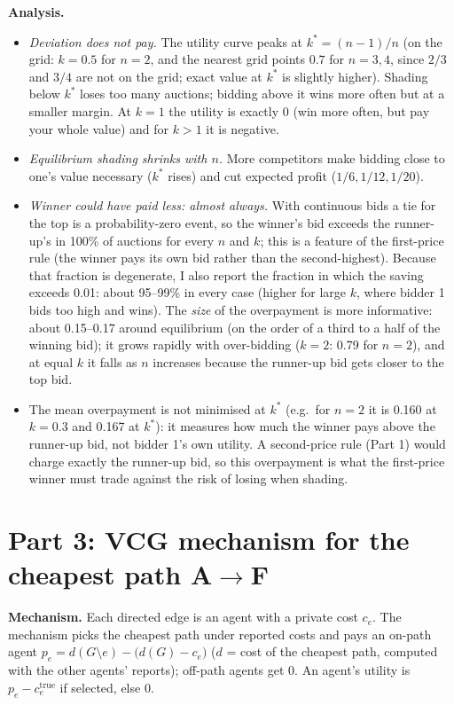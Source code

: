 \documentclass[11pt,a4paper]{article}
\begin{document}
\textbf{Analysis.}
\begin{itemize}
\item \emph{Deviation does not pay.} The utility curve peaks at $k^*=(n-1)/n$ (on the grid: $k=0.5$ for $n=2$, and the nearest grid points $0.7$ for $n=3,4$, since $2/3$
and $3/4$ are not on the grid; exact value at $k^*$ is slightly higher). Shading below $k^*$ loses too many auctions; bidding above
it wins more often but at a smaller margin. At $k=1$ the utility is exactly 0 (win more often, but pay your whole value) and for $k>1$ it is negative.
\item \emph{Equilibrium shading shrinks with $n$.} More competitors make bidding close to one's value necessary ($k^*$ rises)
and cut expected profit ($1/6,1/12,1/20$).
\item \emph{Winner could have paid less: almost always.} With continuous bids a tie for the top is a
probability-zero event, so the winner's bid exceeds the runner-up's in 100\% of auctions for every $n$ and $k$; this is a feature of the
first-price rule (the winner pays its own bid rather than the second-highest). Because that fraction is degenerate,
I also report the fraction in which the saving exceeds 0.01: about 95--99\% in every case (higher for large $k$, where bidder 1 bids too high
and wins). The \emph{size} of the overpayment is more informative: about 0.15--0.17 around equilibrium (on the order of a third to a half of the winning bid);
it grows rapidly with over-bidding ($k=2$: 0.79 for $n=2$), and at equal $k$ it falls as $n$ increases because the runner-up bid
gets closer to the top bid.
\item The mean overpayment is not minimised at $k^*$ (e.g.\ for $n=2$ it is 0.160 at $k=0.3$ and 0.167 at $k^*$): it measures how much
the winner pays above the runner-up bid, not bidder 1's own utility. A second-price rule (Part 1) would charge exactly the runner-up bid, so
this overpayment is what the first-price winner must trade against the risk of losing when shading.
\end{itemize}

\section{Part 3: VCG mechanism for the cheapest path A$\to$F}
\textbf{Mechanism.} Each directed edge is an agent with a private cost $c_e$. The mechanism picks the cheapest path under reported costs and pays an
on-path agent $p_e=d(G\setminus e)-\big(d(G)-c_e\big)$ ($d$ = cost of the cheapest path, computed with the other agents' reports);
off-path agents get 0. An agent's utility is $p_e-c_e^{\text{true}}$ if selected, else 0.
\end{document}
